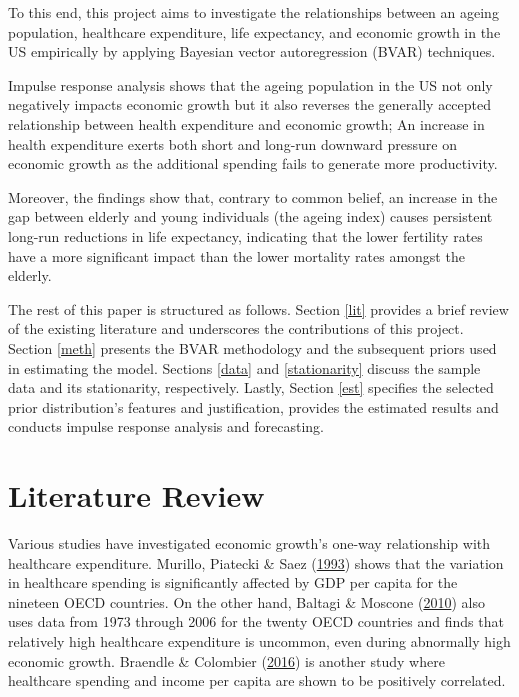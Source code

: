 \documentclass[11pt,preprint, authoryear]{elsarticle}
\numberwithin{equation}{section}
\numberwithin{figure}{section}
\numberwithin{table}{section}
\begin{document}
To this end, this project aims to investigate the relationships between
an ageing population, healthcare expenditure, life expectancy, and
economic growth in the US empirically by applying Bayesian vector
autoregression (BVAR) techniques.

Impulse response analysis shows that the ageing population in the US not
only negatively impacts economic growth but it also reverses the
generally accepted relationship between health expenditure and economic
growth; An increase in health expenditure exerts both short and long-run
downward pressure on economic growth as the additional spending fails to
generate more productivity.

Moreover, the findings show that, contrary to common belief, an increase
in the gap between elderly and young individuals (the ageing index)
causes persistent long-run reductions in life expectancy, indicating
that the lower fertility rates have a more significant impact than the
lower mortality rates amongst the elderly.

The rest of this paper is structured as follows. Section \ref{lit}
provides a brief review of the existing literature and underscores the
contributions of this project. Section \ref{meth} presents the BVAR
methodology and the subsequent priors used in estimating the model.
Sections \ref{data} and \ref{stationarity} discuss the sample data and
its stationarity, respectively. Lastly, Section \ref{est} specifies the
selected prior distribution's features and justification, provides the
estimated results and conducts impulse response analysis and
forecasting.

\hypertarget{literature-review}{%
\section{\texorpdfstring{Literature Review
\label{lit}}{Literature Review }}\label{literature-review}}

Various studies have investigated economic growth's one-way relationship
with healthcare expenditure. Murillo, Piatecki \& Saez
(\protect\hyperlink{ref-murillo1993}{1993}) shows that the variation in
healthcare spending is significantly affected by GDP per capita for the
nineteen OECD countries. On the other hand, Baltagi \& Moscone
(\protect\hyperlink{ref-baltagi2010}{2010}) also uses data from 1973
through 2006 for the twenty OECD countries and finds that relatively
high healthcare expenditure is uncommon, even during abnormally high
economic growth. Braendle \& Colombier
(\protect\hyperlink{ref-braendle2016}{2016}) is another study where
healthcare spending and income per capita are shown to be positively
correlated.
\end{document}
